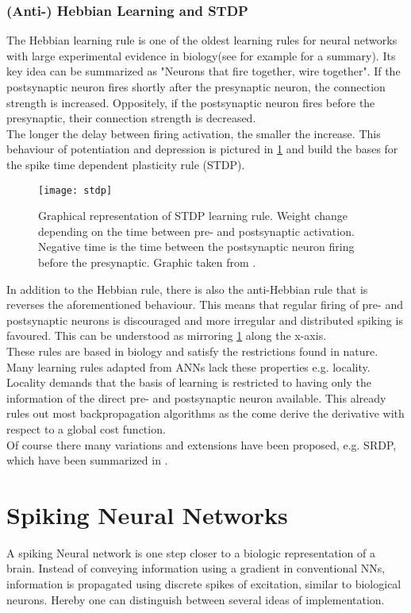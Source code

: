 \subsubsection{(Anti-) Hebbian Learning and STDP}
The Hebbian learning rule is one of the oldest learning rules for neural networks with large experimental evidence in biology(see for example \cite{feldman_spike-timing_2012} for a summary). Its key idea can be summarized as "Neurons that fire together, wire together". If the postsynaptic neuron fires shortly after the presynaptic neuron, the connection strength is increased. Oppositely, if the postsynaptic neuron fires before the presynaptic, their connection strength is decreased.\\
The longer the delay between firing activation, the smaller the increase. This behaviour of potentiation and depression is pictured in \cref{fig:stdp} and build the bases for the spike time dependent plasticity rule (STDP).
\begin{figure}
	\centering
	\texttt{[image: stdp]}
	\caption{Graphical representation of STDP learning rule. Weight change depending on the time between pre- and postsynaptic activation. Negative time is the time between the postsynaptic neuron firing before the presynaptic. Graphic taken from \cite{yi_learning_2023}.}
	\label{fig:stdp}
\end{figure}
In addition to the Hebbian rule, there is also the anti-Hebbian rule that is reverses the aforementioned behaviour. This means that regular firing of pre- and postsynaptic neurons is discouraged and more irregular and distributed spiking is favoured. This can be understood as mirroring \cref{fig:stdp} along the x-axis.\\

These rules are based in biology and satisfy the restrictions found in nature. Many learning rules adapted from \acp{ANN} lack these properties e.g. locality. Locality demands that the basis of learning is restricted to having only the information of the direct pre- and postsynaptic neuron available. This already rules out most backpropagation algorithms as the come derive the derivative with respect to a global cost function.\\

Of course there many variations and extensions have been proposed, e.g. \ac{SRDP}\cite{kempter_hebbian_1999}, which have been summarized in  \cite{yi_learning_2023}.



\section{Spiking Neural Networks}
A spiking Neural network is one step closer to a biologic representation of a brain. Instead of conveying information using a gradient in conventional \ac{NN}s, information is propagated using discrete spikes of excitation, similar to biological neurons. Hereby one can distinguish between several ideas of implementation.
